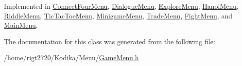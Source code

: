 Implemented in \hyperlink{classConnectFourMenu_a6a826d0810795584cfb4b601d5cd5df2}{Connect\-Four\-Menu}, \hyperlink{classDialogueMenu_a0d9ad90b84f6b104b673be1ff66185c2}{Dialogue\-Menu}, \hyperlink{classExploreMenu_a01fdbb56ef495290e825ec9a57ecd2b6}{Explore\-Menu}, \hyperlink{classHanoiMenu_a0280d0e443642407fda5903346be1a39}{Hanoi\-Menu}, \hyperlink{classRiddleMenu_a2d103283c58744ffa0e77e62a24e7ccb}{Riddle\-Menu}, \hyperlink{classTicTacToeMenu_ab736aba3ecb23a6b28cde04729556088}{Tic\-Tac\-Toe\-Menu}, \hyperlink{classMinigameMenu_abde3ae319bf1660a8626c6f765e054a8}{Minigame\-Menu}, \hyperlink{classTradeMenu_aaf93d0a5ee2574d2926bd22de278fb17}{Trade\-Menu}, \hyperlink{classFightMenu_a22b8ce181d2f327bd8839315c4843cf5}{Fight\-Menu}, and \hyperlink{classMainMenu_a44ab04810a68d7ddf3843464573b7967}{Main\-Menu}.



The documentation for this class was generated from the following file\-:\begin{DoxyCompactItemize}
\item 
/home/rigt2720/\-Kodika/\-Menu/\hyperlink{GameMenu_8h}{Game\-Menu.\-h}\end{DoxyCompactItemize}
